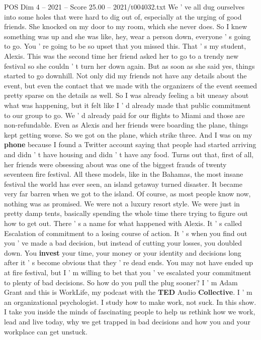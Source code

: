 \begin{textsample}{POS Dim 4 – 2021 – Score 25.00 – 2021/t004032.txt}  \label{ex:f4_pos_034}
We ' ve all dug ourselves into some holes that were hard to dig out of, especially at the urging of good friends.
She knocked on my door to my room, which she never does.
So I knew something was up and she was like, hey, wear a person down, everyone ' s going to go.
You ' re going to be so upset that you missed this.
That ' s my student, Alexis.
This was the second time her friend asked her to go to a trendy new festival so she couldn ' t turn her down again.
But as soon as she said yes, things started to go downhill.
Not only did my friends not have any details about the event, but even the contact that we made with the organizers of the event seemed pretty sparse on the details as well.
So I was already feeling a bit uneasy about what was happening, but it felt like I ' d already made that public commitment to our group to go.
We ' d already paid for our flights to Miami and those are non-refundable.
Even as Alexis and her friends were boarding the plane, things kept getting worse.
So we got on the plane, which strike three.
And I was on my \textbf{phone} because I found a Twitter account saying that people had started arriving and didn ' t have housing and didn ' t have any food.
Turns out that, first of all, her friends were obsessing about was one of the biggest frauds of twenty seventeen fire festival.
All these models, like in the Bahamas, the most insane festival the world has ever seen, an island getaway turned disaster.
It became very far barren when we got to the island.
Of course, as most people know now, nothing was as promised.
We were not a luxury resort style.
We were just in pretty damp tents, basically spending the whole time there trying to figure out how to get out.
There ' s a name for what happened with Alexis.
It ' s called Escalation of commitment to a losing course of action.
It ' s when you find out you ' ve made a bad decision, but instead of cutting your losses, you doubled down.
You \textbf{invest} your time, your money or your identity and decisions long after it ' s become obvious that they ' re dead ends.
You may not have ended up at fire festival, but I ' m willing to bet that you ' ve escalated your commitment to plenty of bad decisions.
So how do you pull the plug sooner?
I ' m Adam Grant and this is WorkLife, my podcast with the \textbf{TED} Audio \textbf{Collective}.
I ' m an organizational psychologist.
I study how to make work, not suck.
In this show.
I take you inside the minds of fascinating people to help us rethink how we work, lead and live today, why we get trapped in bad decisions and how you and your workplace can get unstuck.

\end{textsample}
